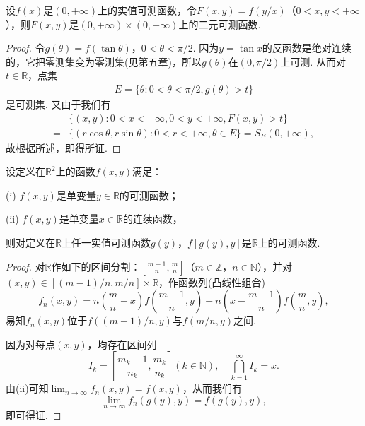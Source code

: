 \documentclass[../../main.tex]{subfiles}%
\begin{document}
\begin{example}
设\(f(x)\)是\((0, +\infty)\)上的实值可测函数，令\(F(x, y) = f(y / x)\)（\(0 < x, y < +\infty\)），则\(F(x, y)\)是\((0, +\infty) \times (0, +\infty)\)上的二元可测函数.
\end{example}
\begin{proof}
令\(g(\theta) = f(\tan\theta)\)，\(0 < \theta < \pi / 2\). 因为\(y = \tan x\)的反函数是绝对连续的，它把零测集变为零测集(见第五章)，所以\(g(\theta)\)在\((0, \pi / 2)\)上可测. 从而对\(t \in \mathbb{R}\)，点集
\begin{align*}
E = \{\theta: 0 < \theta < \pi / 2, g(\theta) > t\}
\end{align*}
是可测集. 又由于我们有
\begin{align*}
&\{(x, y): 0 < x < +\infty, 0 < y < +\infty, F(x, y) > t\} \\
=&\{(r\cos\theta, r\sin\theta): 0 < r < +\infty, \theta \in E\} = S_{E}(0, +\infty),
\end{align*}
故根据所述，即得所证.
\end{proof}

\begin{theorem}
设定义在\(\mathbb{R}^{2}\)上的函数\(f(x, y)\)满足：

(i) \(f(x, y)\)是单变量\(y \in \mathbb{R}\)的可测函数；

(ii) \(f(x, y)\)是单变量\(x \in \mathbb{R}\)的连续函数，

则对定义在\(\mathbb{R}\)上任一实值可测函数\(g(y)\)，\(f[g(y), y]\)是\(\mathbb{R}\)上的可测函数.
\end{theorem}
\begin{proof}
对\(\mathbb{R}\)作如下的区间分割：\(\left[\frac{m - 1}{n}, \frac{m}{n}\right]\)（\(m \in \mathbb{Z}\)，\(n \in \mathbb{N}\)），并对\((x, y) \in [(m - 1) / n, m / n] \times \mathbb{R}\)，作函数列(凸线性组合)
\[
f_{n}(x, y) = n\left(\frac{m}{n} - x\right)f\left(\frac{m - 1}{n}, y\right) + n\left(x - \frac{m - 1}{n}\right)f\left(\frac{m}{n}, y\right),
\]
易知\(f_{n}(x, y)\)位于\(f((m - 1) / n, y)\)与\(f(m / n, y)\)之间.

因为对每点\((x, y)\)，均存在区间列
\[
I_{k} = \left[\frac{m_{k} - 1}{n_{k}}, \frac{m_{k}}{n_{k}}\right] (k \in \mathbb{N}), \quad \bigcap_{k = 1}^{\infty} I_{k} = x.
\]
由(ii)可知\(\lim_{n \to \infty} f_{n}(x, y) = f(x, y)\)，从而我们有
\[
\lim_{n \to \infty} f_{n}(g(y), y) = f(g(y), y),
\]
即可得证. 
\end{proof}
\end{document}
